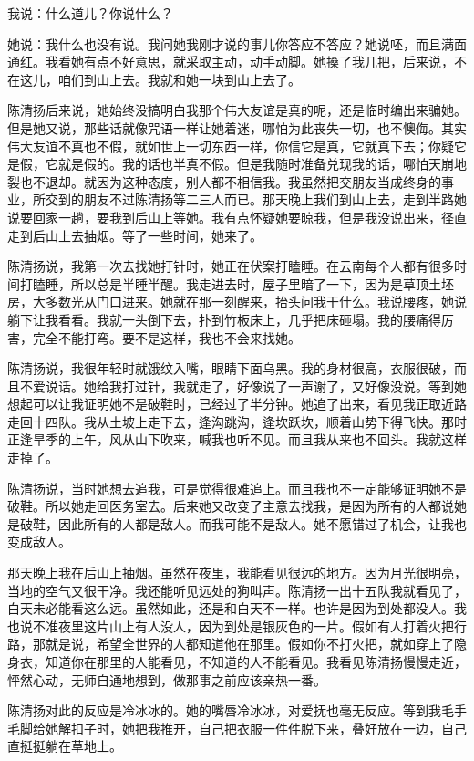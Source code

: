  我说：什么道儿？你说什么？ 
 
 她说：我什么也没有说。我问她我刚才说的事儿你答应不答应？她说呸，而且满面通红。我看她有点不好意思，就采取主动，动手动脚。她搡了我几把，后来说，不在这儿，咱们到山上去。我就和她一块到山上去了。 
 
 陈清扬后来说，她始终没搞明白我那个伟大友谊是真的呢，还是临时编出来骗她。但是她又说，那些话就像咒语一样让她着迷，哪怕为此丧失一切，也不懊侮。其实伟大友谊不真也不假，就如世上一切东西一样，你信它是真，它就真下去；你疑它是假，它就是假的。我的话也半真不假。但是我随时准备兑现我的话，哪怕天崩地裂也不退却。就因为这种态度，别人都不相信我。我虽然把交朋友当成终身的事业，所交到的朋友不过陈清扬等二三人而已。那天晚上我们到山上去，走到半路她说要回家一趟，要我到后山上等她。我有点怀疑她要晾我，但是我没说出来，径直走到后山上去抽烟。等了一些时间，她来了。 
 
 陈清扬说，我第一次去找她打针时，她正在伏案打瞌睡。在云南每个人都有很多时间打瞌睡，所以总是半睡半醒。我走进去时，屋子里暗了一下，因为是草顶土坯房，大多数光从门口进来。她就在那一刻醒来，抬头问我干什么。我说腰疼，她说躺下让我看看。我就一头倒下去，扑到竹板床上，几乎把床砸塌。我的腰痛得厉害，完全不能打弯。要不是这样，我也不会来找她。 
 
 陈清扬说，我很年轻时就饿纹入嘴，眼睛下面乌黑。我的身材很高，衣服很破，而且不爱说话。她给我打过针，我就走了，好像说了一声谢了，又好像没说。等到她想起可以让我证明她不是破鞋时，已经过了半分钟。她追了出来，看见我正取近路走回十四队。我从土坡上走下去，逢沟跳沟，逢坎跃坎，顺着山势下得飞快。那时正逢旱季的上午，风从山下吹来，喊我也听不见。而且我从来也不回头。我就这样走掉了。 
 
 陈清扬说，当时她想去追我，可是觉得很难追上。而且我也不一定能够证明她不是破鞋。所以她走回医务室去。后来她又改变了主意去找我，是因为所有的人都说她是破鞋，因此所有的人都是敌人。而我可能不是敌人。她不愿错过了机会，让我也变成敌人。 
 
 那天晚上我在后山上抽烟。虽然在夜里，我能看见很远的地方。因为月光很明亮，当地的空气又很干净。我还能听见远处的狗叫声。陈清扬一出十五队我就看见了，白天未必能看这么远。虽然如此，还是和白天不一样。也许是因为到处都没人。我也说不准夜里这片山上有人没人，因为到处是银灰色的一片。假如有人打着火把行路，那就是说，希望全世界的人都知道他在那里。假如你不打火把，就如穿上了隐身衣，知道你在那里的人能看见，不知道的人不能看见。我看见陈清扬慢慢走近，怦然心动，无师自通地想到，做那事之前应该亲热一番。 
 
 陈清扬对此的反应是冷冰冰的。她的嘴唇冷冰冰，对爱抚也毫无反应。等到我毛手毛脚给她解扣子时，她把我推开，自己把衣服一件件脱下来，叠好放在一边，自己直挺挺躺在草地上。 
 
